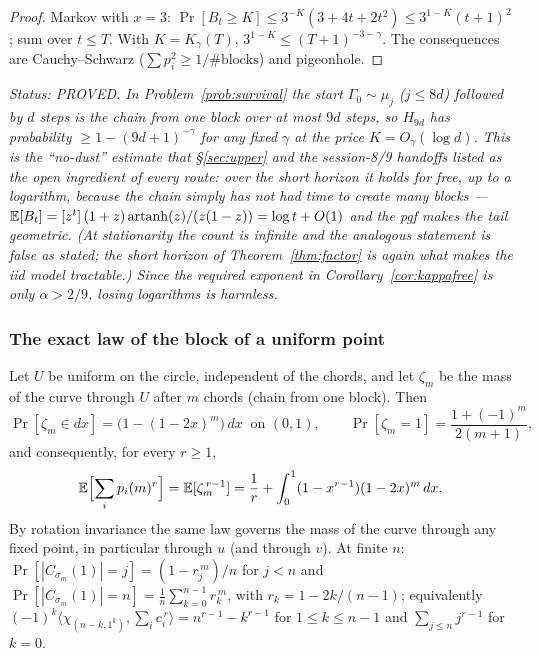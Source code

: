 \begin{proof}
Markov with $x=3$: $\Pr[B_t\ge K]\le3^{-K}(3+4t+2t^2)\le3^{1-K}(t+1)^2$;
sum over $t\le T$.  With $K=K_\gamma(T)$,
$3^{1-K}\le(T+1)^{-3-\gamma}$.  The consequences are Cauchy--Schwarz
($\sum p_i^2\ge1/\#\text{blocks}$) and pigeonhole.
\end{proof}

\emph{Status: PROVED.  In Problem~\ref{prob:survival} the start
$\Gamma_0\sim\mu_j$ ($j\le8d$) followed by $d$ steps is the chain from
one block over at most $9d$ steps, so $H_{9d}$ has probability
$\ge1-(9d+1)^{-\gamma}$ for any fixed $\gamma$ at the price
$K=O_\gamma(\log d)$.  This is the ``no-dust'' estimate that
\S\ref{sec:upper} and the session-8/9 handoffs listed as the open
ingredient of every route: over the short horizon it holds for free,
up to a logarithm, because the chain simply has not had time to create
many blocks --- $\mathbb{E}[B_t]=[z^t]\,(1+z)\operatorname{artanh}(z)/(z(1-z))=\log t+O(1)$
and the pgf makes the tail geometric.  (At stationarity the count is infinite and the analogous
statement is false as stated; the short horizon of
Theorem~\ref{thm:factor} is again what makes the iid model tractable.)
Since the required exponent in Corollary~\ref{cor:kappafree} is only
$\alpha>2/9$, losing logarithms is harmless.}

\subsubsection{The exact law of the block of a uniform point}
\label{sec:sizebiased}

\begin{theorem}\label{thm:sizebiased}
Let $U$ be uniform on the circle, independent of the chords, and let
$\zeta_m$ be the mass of the curve through $U$ after $m$ chords (chain
from one block).  Then
\[
\Pr[\zeta_m\in dx]=\bigl(1-(1-2x)^m\bigr)\,dx\ \text{ on }(0,1),
\qquad
\Pr[\zeta_m=1]=\frac{1+(-1)^m}{2(m+1)} ,
\]
and consequently, for every $r\ge1$,
\[
\mathbb{E}\Bigl[\sum_ip_i(m)^r\Bigr]=\mathbb{E}[\zeta_m^{\,r-1}]
=\frac1r+\int_0^1(1-x^{r-1})(1-2x)^m\,dx .
\]
By rotation invariance the same law governs the mass of the curve
through any fixed point, in particular through $u$ (and through $v$).
At finite $n$: $\Pr[|C_{\sigma_m}(1)|=j]=(1-r_j^{\,m})/n$ for $j<n$ and
$\Pr[|C_{\sigma_m}(1)|=n]=\frac1n\sum_{k=0}^{n-1}r_k^{\,m}$, with
$r_k=1-2k/(n-1)$; equivalently
$(-1)^k\langle\chi_{(n-k,1^k)},\sum_ic_i^{\,r}\rangle=n^{r-1}-k^{r-1}$
for $1\le k\le n-1$ and $\sum_{j\le n}j^{r-1}$ for $k=0$.
\end{theorem}

